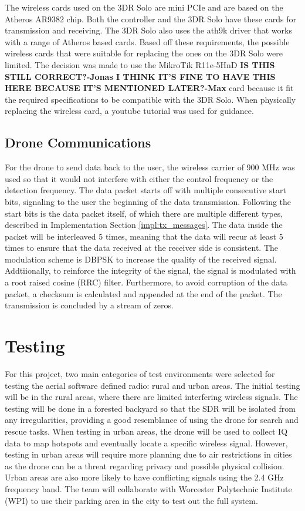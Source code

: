 The wireless cards used on the 3DR Solo are mini PCIe and are based on the Atheros AR9382 chip. Both the controller and the 3DR Solo have these cards for transmission and receiving. The 3DR Solo also uses the ath9k driver that works with a range of Atheros based cards. Based off these requirements, the possible wireless cards that were suitable for replacing the ones on the 3DR Solo were limited. The decision was made to use the MikroTik R11e-5HnD \textbf{IS THIS STILL CORRECT?-Jonas I THINK IT'S FINE TO HAVE THIS HERE BECAUSE IT'S MENTIONED LATER?-Max} card because it fit the required specifications to be compatible with the 3DR Solo. When physically replacing the wireless card, a youtube tutorial was used for guidance. \par 

\subsection{Drone Communications}
For the drone to send data back to the user, the wireless carrier of 900 MHz was used so that it would not interfere with either the control frequency or the detection frequency. The data packet starts off with multiple consecutive start bits, signaling to the user the beginning of the data transmission. Following the start bits is the data packet itself, of which there are multiple different types, described in Implementation Section \ref{impl:tx_messages}. The data inside the packet will be interleaved 5 times, meaning that the data will recur at least 5 times to ensure that the data received at the receiver side is consistent. The modulation scheme is DBPSK to increase the quality of the received signal. Addtiionally, to reinforce the integrity of the signal, the signal is modulated with a root raised cosine (RRC) filter. Furthermore, to avoid corruption of the data packet, a checksum is calculated and appended at the end of the packet. The transmission is concluded by a stream of zeros. \par

\section{Testing}
For this project, two main categories of test environments were selected for testing the aerial software defined radio: rural and urban areas. The initial testing will be in the rural areas, where there are limited interfering wireless signals. The testing will be done in a forested backyard so that the SDR will be isolated from any irregularities, providing a good resemblance of using the drone for search and rescue tasks. When testing in urban areas, the drone will be used to collect IQ data to map hotspots and eventually locate a specific wireless signal. However, testing in urban areas will require more planning due to air restrictions in cities as the drone can be a threat regarding privacy and possible physical collision. Urban areas are also more likely to have conflicting signals using the 2.4 GHz frequency band. The team will collaborate with Worcester Polytechnic Institute (WPI) to use their parking area in the city to test out the full system. \par
 
